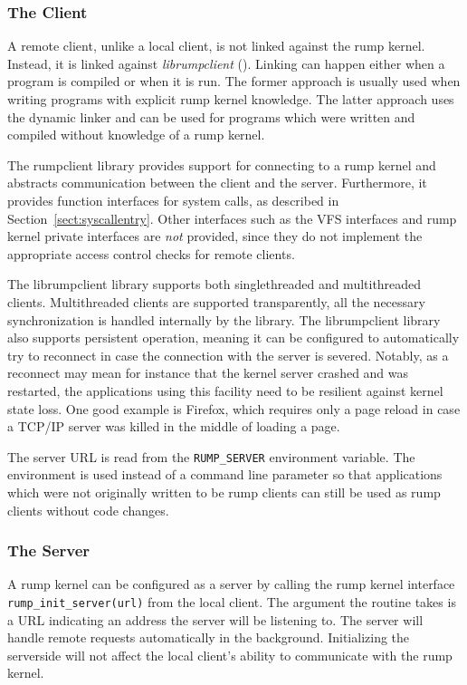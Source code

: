 \subsubsection{The Client}

A remote client, unlike a local client, is not linked against the rump kernel.  Instead,
it is linked against \textit{librumpclient}
().  Linking can happen
either when a program is compiled or when it is run.  The former
approach is usually used when writing programs with explicit rump
kernel knowledge.  The latter approach uses the dynamic linker and
can be used for programs which were written and compiled without knowledge of
a rump kernel.

The rumpclient library provides support for connecting to a rump
kernel and abstracts communication between the client and the
server.  Furthermore, it provides function interfaces for system
calls, as described in Section~\ref{sect:syscallentry}.  Other
interfaces such as the VFS interfaces and rump kernel private
interfaces are \textit{not} provided, since they do not implement
the appropriate access control checks for remote clients.

The librumpclient library supports both singlethreaded and
multithreaded clients.  Multithreaded clients are supported
transparently, \ie all the necessary synchronization is handled
internally by the library.  The librumpclient library also supports persistent operation,
meaning it can be configured to automatically try to reconnect in
case the connection with the server is severed.  Notably, as a reconnect
may mean for instance that the kernel server crashed and was
restarted, the applications using this facility need to be
resilient against kernel state loss.  One good example is
Firefox, which requires only a page reload in case a TCP/IP server
was killed in the middle of loading a page.

The server URL is read from the \verb+RUMP_SERVER+ environment
variable.  The environment is used instead of a command line
parameter so that applications which were not originally written
to be rump clients can still be used as rump clients without code
changes.

\subsubsection{The Server}

A rump kernel can be configured as a server by calling the rump kernel
interface \verb+rump_init_server(url)+ from the local client.  The
argument the routine takes is a URL indicating an address the server will
be listening to.  The server will handle remote requests automatically
in the background.  Initializing the serverside will not affect the local
client's ability to communicate with the rump kernel.

